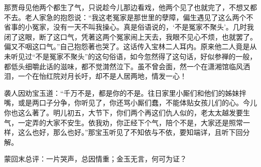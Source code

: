 \begin{parag}
    那贾母见他两个都生了气，只说趁今儿那边看戏，他两个见了也就完了，不想又都不去。老人家急的抱怨说：“我这老冤家是那世里的孽障，偏生遇见了这么两个不省事的小冤家，没有一天不叫我操心。真是俗语说的，‘不是冤家不聚头’。几时我闭了这眼，断了这口气，凭著这两个冤家闹上天去，我眼不见心不烦，也就罢了。偏又不咽这口气。”自己抱怨著也哭了。这话传入宝林二人耳内。原来他二人竟是从未听见过“不是冤家不聚头”的这句俗语，如今忽然得了这句话，好似参禅的一般，都低头细嚼此话的滋味，都不觉潸然泣下。虽不曾会面，然一个在潇湘馆临风洒泪，一个在怡红院对月长吁，却不是人居两地，情发一心！
\end{parag}


\begin{parag}
    袭人因劝宝玉道：“千万不是，都是你的不是。往日家里小厮们和他们的姊妹拌嘴，或是两口子分争，你听见了，你还骂小厮们蠢，不能体贴女孩儿们的心。今儿你也这么著了。明儿初五，大节下，你们两个再这们仇人似的，老太太越发要生气，一定弄的大家不安生。依我劝，你正经下个气，陪个不是，大家还是照常一样，这么也好，那么也好。”那宝玉听见了不知依与不依，要知端详，且听下回分解。
\end{parag}


\begin{parag}
    \begin{note}蒙回末总评：一片哭声，总因情重；金玉无言，何可为证？\end{note}
\end{parag}

